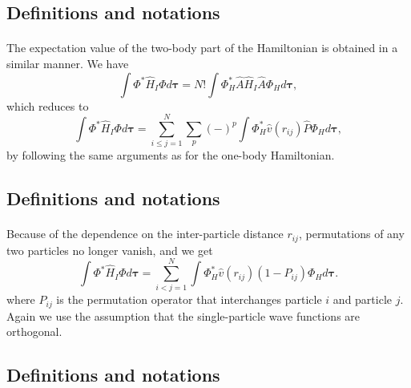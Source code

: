 \documentclass[%
twoside,                 %
final,                   %
10pt]{article}
\begin{document}
\subsection{Definitions and notations}

\paragraph{}
The expectation value of the two-body part of the Hamiltonian is obtained in a
similar manner. We have
\[
  \int \Phi^*\hat{H}_I\Phi d\mathbf{\tau} 
  = N! \int \Phi_H^*\hat{A}\hat{H}_I\hat{A}\Phi_H d\mathbf{\tau},
\]
which reduces to
\[
 \int \Phi^*\hat{H}_I\Phi d\mathbf{\tau} 
  = \sum_{i\le j=1}^N \sum_{p} (-)^p\int 
  \Phi_H^*\hat{v}(r_{ij})\hat{P}\Phi_H d\mathbf{\tau},
\]
by following the same arguments as for the one-body
Hamiltonian.



\subsection{Definitions and notations}

\paragraph{}
Because of the dependence on the inter-particle distance $r_{ij}$,  permutations of
any two particles no longer vanish, and we get
\[
  \int \Phi^*\hat{H}_I\Phi d\mathbf{\tau} 
  = \sum_{i < j=1}^N \int  
  \Phi_H^*\hat{v}(r_{ij})(1-P_{ij})\Phi_H d\mathbf{\tau}.
\]
where $P_{ij}$ is the permutation operator that interchanges
particle $i$ and particle $j$. Again we use the assumption that the single-particle wave functions
are orthogonal.




\subsection{Definitions and notations}

\end{document}

